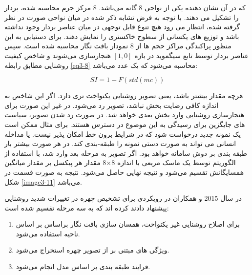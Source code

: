 \noindent
که در آن  نشان دهنده یکی از نواحی 8 گانه می‌باشد. 8 مرکز جرم محاسبه شده، بردار  را تشکیل می دهند. با توجه به فرض تشابه ذکر شده در میان نواحی صورت در نظر گرفته شده، انتظار می رود هیچ تنوع قابل توجهی در میان عناصر بردار وجود نداشته باشد و توزیع های یکسانی از سطوح خاکستری را نمایش دهند. برای دستیابی به این منظور پراکندگی مراکز حجم ها از 8 نمودار بافت نگار محاسبه شده است. سپس عناصر بردار  توسط تابع سیگموید  در بازه $[1,0]$ هنجارسازی می‌شوند و شاخص کیفیت روشنایی مطابق رابطه \ref{eq3-8} محاسبه می‌شود که یک عدد می‌باشد:

\begin{equation}
\label{eq3-8}
SI=1-F(std\left(mc\right))	
\end{equation}

\noindent
هرچه مقدار  بیشتر باشد، یعنی تصویر روشنایی یکنواخت تری دارد. اگر این شاخص به اندازه کافی رضایت بخش نباشد، تصویر رد می‌شود. در غیر این صورت برای هنجارسازی روشنایی وارد بخش بعدی خواهد شد. در صورت رد شدن تصویر، سیاست های جایگزین برای رسیدگی به این موضوع در دسترس هستند. برای مثال ممکن است یک نمونه جدید درخواست شود که در شرایط برون خط امکان پذیر نیست. یا مداخله انسانی می تواند به صورت دستی نمونه را طبقه-بندی کند. در هر صورت بیشتر بار طبقه بندی بر دوش سامانه خواهد بود. اگر تصویر به مرحله بعد وارد شد، با استفاده از الگوریتم  توسط یک ماسک مربعی با اندازه 8×8 مقدار هر پیکسل بر مقدار میانگین همسایگانش تقسیم می‌شود و نتیجه نهایی حاصل می‌شود. نتیجه به صورت قسمت  در شکل \ref{image3-11} می‌باشد.

\noindent‏
در سال 2015  و همکاران در \cite{HUSSAINSHAH201597} رویکردی برای تشخیص چهره در تغییرات شدید روشنایی پیشنهاد دادند کرده اند که به سه مرحله تقسیم شده است:
\begin{enumerate}
\item
	برای اصلاح روشنایی غیر یکنواخت، همسان سازی بافت نگار براساس بر اساس ناحیه استفاده می‌شود.
\item 
	ویژگی های مبتنی بر  از تصویر چهره استخراج می‌شود.
\item
فرایند طبقه بندی بر اساس مدل  انجام می‌شود.
\end{enumerate}
	
